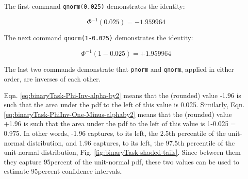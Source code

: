 \documentclass[
]{book}
\begin{document}
The first command \texttt{qnorm(0.025)} demonstrates the identity:

\begin{equation} 
\Phi^{-1}(0.025)=-1.959964
\label{eq:binaryTask-Phi-Inv-alpha-by2}
\end{equation}

The next command \texttt{qnorm(1-0.025)} demonstrates the identity:

\begin{equation} 
\Phi^{-1}(1-0.025)=+1.959964
\label{eq:binaryTask-PhiInv-One-Minus-alphaby2}
\end{equation}

The last two commands demonstrate that \texttt{pnorm} and \texttt{qnorm}, applied in either order, are inverses of each other.

Eqn. \eqref{eq:binaryTask-Phi-Inv-alpha-by2} means that the (rounded) value -1.96 is such that the area under the pdf to the left of this value is 0.025. Similarly, Eqn. \eqref{eq:binaryTask-PhiInv-One-Minus-alphaby2} means that the (rounded) value +1.96 is such that the area under the pdf to the left of this value is 1-0.025 = 0.975. In other words, -1.96 captures, to its left, the 2.5th percentile of the unit-normal distribution, and 1.96 captures, to its left, the 97.5th percentile of the unit-normal distribution, Fig. \ref{fig:binaryTask-shaded-tails}. Since between them they capture 95percent of the unit-normal pdf, these two values can be used to estimate 95percent confidence intervals.
\end{document}
